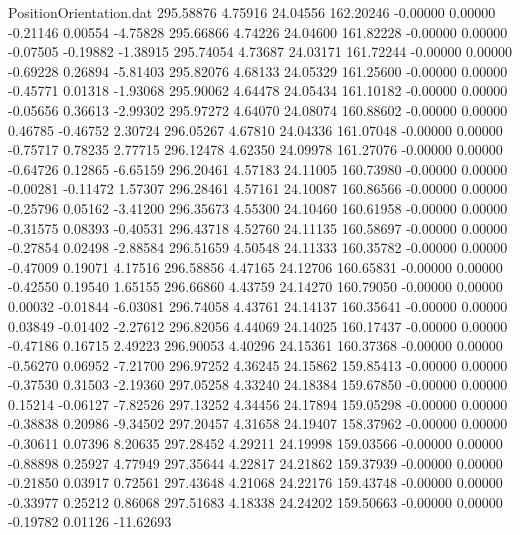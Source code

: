 \begin{filecontents}{PositionOrientation.dat}
 295.58876    4.75916   24.04556   162.20246   -0.00000    0.00000   -0.21146    0.00554   -4.75828
 295.66866    4.74226   24.04600   161.82228   -0.00000    0.00000   -0.07505   -0.19882   -1.38915
 295.74054    4.73687   24.03171   161.72244   -0.00000    0.00000   -0.69228    0.26894   -5.81403
 295.82076    4.68133   24.05329   161.25600   -0.00000    0.00000   -0.45771    0.01318   -1.93068
 295.90062    4.64478   24.05434   161.10182   -0.00000    0.00000   -0.05656    0.36613   -2.99302
 295.97272    4.64070   24.08074   160.88602   -0.00000    0.00000    0.46785   -0.46752    2.30724
 296.05267    4.67810   24.04336   161.07048   -0.00000    0.00000   -0.75717    0.78235    2.77715
 296.12478    4.62350   24.09978   161.27076   -0.00000    0.00000   -0.64726    0.12865   -6.65159
 296.20461    4.57183   24.11005   160.73980   -0.00000    0.00000   -0.00281   -0.11472    1.57307
 296.28461    4.57161   24.10087   160.86566   -0.00000    0.00000   -0.25796    0.05162   -3.41200
 296.35673    4.55300   24.10460   160.61958   -0.00000    0.00000   -0.31575    0.08393   -0.40531
 296.43718    4.52760   24.11135   160.58697   -0.00000    0.00000   -0.27854    0.02498   -2.88584
 296.51659    4.50548   24.11333   160.35782   -0.00000    0.00000   -0.47009    0.19071    4.17516
 296.58856    4.47165   24.12706   160.65831   -0.00000    0.00000   -0.42550    0.19540    1.65155
 296.66860    4.43759   24.14270   160.79050   -0.00000    0.00000    0.00032   -0.01844   -6.03081
 296.74058    4.43761   24.14137   160.35641   -0.00000    0.00000    0.03849   -0.01402   -2.27612
 296.82056    4.44069   24.14025   160.17437   -0.00000    0.00000   -0.47186    0.16715    2.49223
 296.90053    4.40296   24.15361   160.37368   -0.00000    0.00000   -0.56270    0.06952   -7.21700
 296.97252    4.36245   24.15862   159.85413   -0.00000    0.00000   -0.37530    0.31503   -2.19360
 297.05258    4.33240   24.18384   159.67850   -0.00000    0.00000    0.15214   -0.06127   -7.82526
 297.13252    4.34456   24.17894   159.05298   -0.00000    0.00000   -0.38838    0.20986   -9.34502
 297.20457    4.31658   24.19407   158.37962   -0.00000    0.00000   -0.30611    0.07396    8.20635
 297.28452    4.29211   24.19998   159.03566   -0.00000    0.00000   -0.88898    0.25927    4.77949
 297.35644    4.22817   24.21862   159.37939   -0.00000    0.00000   -0.21850    0.03917    0.72561
 297.43648    4.21068   24.22176   159.43748   -0.00000    0.00000   -0.33977    0.25212    0.86068
 297.51683    4.18338   24.24202   159.50663   -0.00000    0.00000   -0.19782    0.01126  -11.62693

\end{filecontents}
